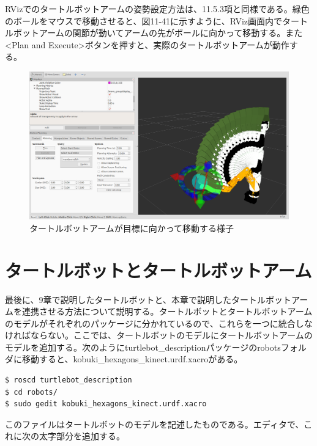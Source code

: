 RVizでのタートルボットアームの姿勢設定方法は、11.5.3項と同様である。緑色のボールをマウスで移動させると、図11-41に示すように、RViz画面内でタートルボットアームの関節が動いてアームの先がボールに向かって移動する。また<Plan and Execute>ボタンを押すと、実際のタートルボットアームが動作する。

\begin{figure}[htp]
  \centering
  \includegraphics[width=12cm]{pictures/chapter11/pic_11_41.png}
  \caption{タートルボットアームが目標に向かって移動する様子}
\end{figure}

\section{タートルボットとタートルボットアーム}

最後に、9章で説明したタートルボットと、本章で説明したタートルボットアームを連携させる方法について説明する。タートルボットとタートルボットアームのモデルがそれぞれのパッケージに分かれているので、これらを一つに統合しなければならない。ここでは、タートルボットのモデルにタートルボットアームのモデルを追加する。次のようにturtlebot\_descriptionパッケージのrobotsフォルダに移動すると、kobuki\_hexagons\_kinect.urdf.xacroがある。

\begin{lstlisting}[language=ROS]
$ roscd turtlebot_description
$ cd robots/
$ sudo gedit kobuki_hexagons_kinect.urdf.xacro
\end{lstlisting}

このファイルはタートルボットのモデルを記述したものである。エディタで、これに次の太字部分を追加する。

